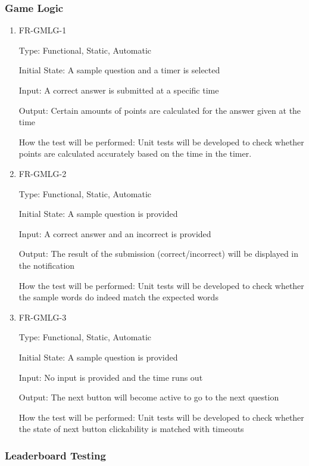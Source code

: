 \documentclass[12pt, titlepage]{article}
\begin{document}
\subsubsection{Game Logic}

\begin{enumerate}
	\item{FR-GMLG-1\\}
	
	Type: Functional, Static, Automatic
	
	Initial State: A sample question and a timer is selected
	
	Input: A correct answer is submitted at a specific time
	
	Output: Certain amounts of points are calculated for the answer given at the time
	
	How the test will be performed: Unit tests will be developed to check whether points are calculated accurately based on the time in the timer.
	
	\item{FR-GMLG-2\\}
	
	Type: Functional, Static, Automatic
	
	Initial State: A sample question is provided
	
	Input: A correct answer and an incorrect is provided
	
	Output: The result of the submission (correct/incorrect) will be displayed in the notification
	
	How the test will be performed: Unit tests will be developed to check whether the sample words do indeed match the expected words
	
	
	\item{FR-GMLG-3\\}
	
	Type: Functional, Static, Automatic
	
	Initial State: A sample question is provided
	
	Input: No input is provided and the time runs out
	
	Output: The next button will become active to go to the next question
	
	How the test will be performed: Unit tests will be developed to check whether the state of next button clickability is matched with timeouts
\end{enumerate}

\subsubsection{Leaderboard Testing}
\end{document}
